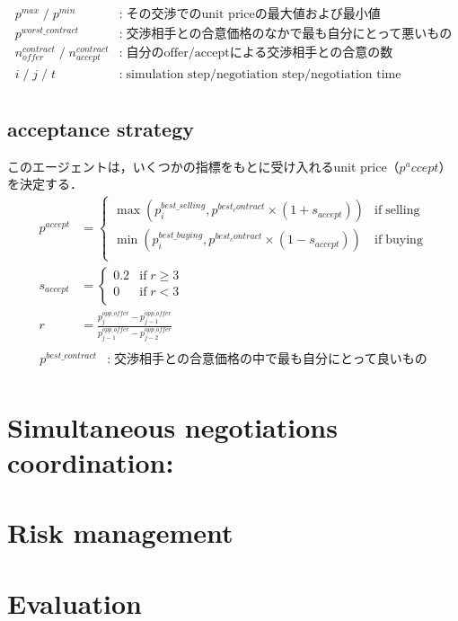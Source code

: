 \documentclass[uplatex, 10pt, a4j]{jsarticle}
\begin{document}
\begin{equation*}
    \begin{split}
        p^{max} \; / \; p^{min} &: \; \text{その交渉でのunit priceの最大値および最小値} \\
        p^{worst\_contract} &: \; \text{交渉相手との合意価格のなかで最も自分にとって悪いもの} \\
        n^{contract}_{offer} \; / \; n^{contract}_{accept} &: \; \text{自分のoffer/acceptによる交渉相手との合意の数} \\
        i \; / \; j \; / \; t &: \; \text{simulation step/negotiation step/negotiation time} \\
    \end{split}
\end{equation*}

\subsection{acceptance strategy}
このエージェントは，いくつかの指標をもとに受け入れるunit price（$p^accept$）を決定する．
\begin{equation*}
    \begin{split}
        p^{accept} &= \left\{\begin{array}{ll}
            \max \left(p^{best\_selling}_{i}, p^{best_contract} \times \left(1+s_{accept}\right) \right) & \mathrm{if \; selling} \\ [3mm]
            \min \left(p^{best\_buying}_{i}, p^{best_contract} \times \left(1-s_{accept}\right) \right)  & \mathrm{if \; buying}  \\
        \end{array}\right. \\
        s_{accept} &= \left\{\begin{array}{ll}
            0.2 & \mathrm{if} \; r \geq 3 \\
            0   & \mathrm{if} \; r < 3    \\
        \end{array}\right. \\
        r &= \frac{p^{opp\_offer}_{j} - p^{opp\_offer}_{j-1}}{p^{opp\_offer}_{j-1} - p^{opp\_offer}_{j-2}} \\
    \end{split}
\end{equation*}
\begin{equation*}
    \begin{split}
        p^{best\_contract} &: \; \text{交渉相手との合意価格の中で最も自分にとって良いもの} \\
    \end{split}
\end{equation*}

\section{Simultaneous negotiations coordination:}

\section{Risk management}

\section{Evaluation}
\end{document}
